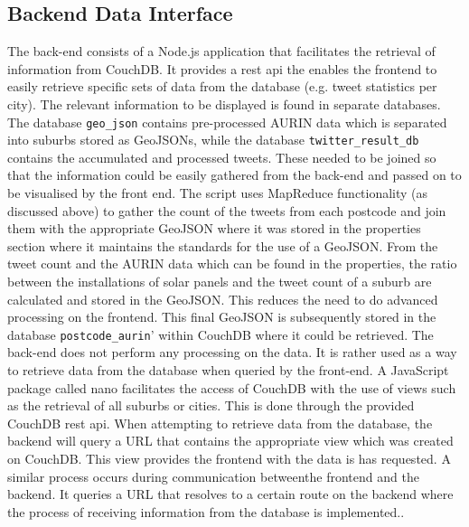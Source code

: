 \documentclass[11pt, oneside]{article}
\begin{document}
\subsection{Backend Data Interface}
\label{sec:backend_data_caching}
The back-end consists of a Node.js application that facilitates the retrieval of information from CouchDB. It provides a \acrfull{rest} \acrshort{api} the enables the frontend to easily retrieve specific sets of data from the database (e.g. tweet statistics per city). 
\newline
\newline
The relevant information to be displayed is found in separate databases. The database \texttt{geo\_json} contains pre-processed AURIN data which is separated into suburbs stored as GeoJSONs, while the database \texttt{twitter\_result\_db} contains the accumulated and processed tweets. These needed to be joined so that the information could be easily gathered from the back-end and passed on to be visualised by the front end. The script uses MapReduce functionality (as discussed above) to gather the count of the tweets from each postcode and join them with the appropriate GeoJSON where it was stored in the properties section where it maintains the standards for the use of a GeoJSON. 
\newline
From the tweet count and the AURIN data which can be found in the properties, the ratio between the installations of solar panels and the tweet count of a suburb are calculated and stored in the GeoJSON. This reduces the need to do advanced processing on the frontend. This final GeoJSON is subsequently stored in the database \texttt{postcode\_aurin}' within CouchDB where it could be retrieved.
\newline
\newline
The back-end does not perform any processing on the data. It is rather used as a way to retrieve data from the database when queried by the front-end. A JavaScript package called nano \citep{nano} facilitates the access of CouchDB with the use of views such as the retrieval of all suburbs or cities. This is done through the provided CouchDB \acrshort{rest} \acrshort{api}. 
\newline
\newline
When attempting to retrieve data from the database, the backend will query a URL that contains the appropriate view which was created on CouchDB. This view provides the frontend with the data is has requested. A similar process occurs during communication betweenthe frontend and the backend. It queries a URL that resolves to a certain route on the backend where the process of receiving information from the database is implemented..
\end{document}
